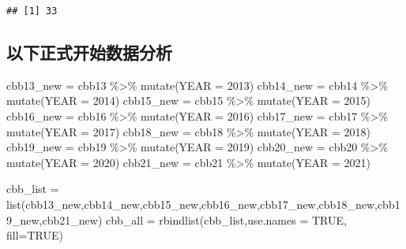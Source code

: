 \documentclass[
]{article}
\newenvironment{Shaded}{\begin{snugshade}}{\end{snugshade}}
\newcommand{\AttributeTok}[1]{\textcolor[rgb]{0.77,0.63,0.00}{#1}}
\newcommand{\ConstantTok}[1]{\textcolor[rgb]{0.00,0.00,0.00}{#1}}
\newcommand{\DecValTok}[1]{\textcolor[rgb]{0.00,0.00,0.81}{#1}}
\newcommand{\FunctionTok}[1]{\textcolor[rgb]{0.00,0.00,0.00}{#1}}
\newcommand{\NormalTok}[1]{#1}
\newcommand{\OtherTok}[1]{\textcolor[rgb]{0.56,0.35,0.01}{#1}}
\newcommand{\SpecialCharTok}[1]{\textcolor[rgb]{0.00,0.00,0.00}{#1}}
\begin{document}
\begin{verbatim}
## [1] 33
\end{verbatim}

\hypertarget{ux4ee5ux4e0bux6b63ux5f0fux5f00ux59cbux6570ux636eux5206ux6790}{%
\subsection{以下正式开始数据分析}\label{ux4ee5ux4e0bux6b63ux5f0fux5f00ux59cbux6570ux636eux5206ux6790}}

\begin{Shaded}
\begin{Highlighting}[]
\NormalTok{cbb13\_new }\OtherTok{=}\NormalTok{ cbb13 }\SpecialCharTok{\%\textgreater{}\%} 
  \FunctionTok{mutate}\NormalTok{(}\AttributeTok{YEAR =} \DecValTok{2013}\NormalTok{)}
\NormalTok{cbb14\_new }\OtherTok{=}\NormalTok{ cbb14 }\SpecialCharTok{\%\textgreater{}\%} 
  \FunctionTok{mutate}\NormalTok{(}\AttributeTok{YEAR =} \DecValTok{2014}\NormalTok{)}
\NormalTok{cbb15\_new }\OtherTok{=}\NormalTok{ cbb15 }\SpecialCharTok{\%\textgreater{}\%} 
  \FunctionTok{mutate}\NormalTok{(}\AttributeTok{YEAR =} \DecValTok{2015}\NormalTok{)}
\NormalTok{cbb16\_new }\OtherTok{=}\NormalTok{ cbb16 }\SpecialCharTok{\%\textgreater{}\%} 
  \FunctionTok{mutate}\NormalTok{(}\AttributeTok{YEAR =} \DecValTok{2016}\NormalTok{)}
\NormalTok{cbb17\_new }\OtherTok{=}\NormalTok{ cbb17 }\SpecialCharTok{\%\textgreater{}\%} 
  \FunctionTok{mutate}\NormalTok{(}\AttributeTok{YEAR =} \DecValTok{2017}\NormalTok{)}
\NormalTok{cbb18\_new }\OtherTok{=}\NormalTok{ cbb18 }\SpecialCharTok{\%\textgreater{}\%} 
  \FunctionTok{mutate}\NormalTok{(}\AttributeTok{YEAR =} \DecValTok{2018}\NormalTok{)}
\NormalTok{cbb19\_new }\OtherTok{=}\NormalTok{ cbb19 }\SpecialCharTok{\%\textgreater{}\%} 
  \FunctionTok{mutate}\NormalTok{(}\AttributeTok{YEAR =} \DecValTok{2019}\NormalTok{)}
\NormalTok{cbb20\_new }\OtherTok{=}\NormalTok{ cbb20 }\SpecialCharTok{\%\textgreater{}\%} 
  \FunctionTok{mutate}\NormalTok{(}\AttributeTok{YEAR =} \DecValTok{2020}\NormalTok{)}
\NormalTok{cbb21\_new }\OtherTok{=}\NormalTok{ cbb21 }\SpecialCharTok{\%\textgreater{}\%} 
  \FunctionTok{mutate}\NormalTok{(}\AttributeTok{YEAR =} \DecValTok{2021}\NormalTok{)}

\NormalTok{cbb\_list }\OtherTok{=} \FunctionTok{list}\NormalTok{(cbb13\_new,cbb14\_new,cbb15\_new,cbb16\_new,cbb17\_new,cbb18\_new,cbb19\_new,cbb21\_new)}
\NormalTok{cbb\_all }\OtherTok{=} \FunctionTok{rbindlist}\NormalTok{(cbb\_list,}\AttributeTok{use.names =} \ConstantTok{TRUE}\NormalTok{, }\AttributeTok{fill=}\ConstantTok{TRUE}\NormalTok{)}
\end{Highlighting}
\end{Shaded}
\end{document}

